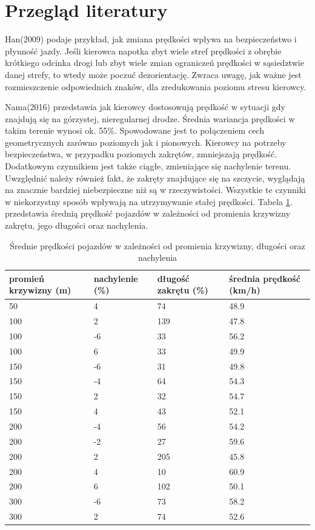 \section{Przegląd literatury}
\label{sec:przegladLiteratury}	

Han(2009) podaje przykład, jak zmiana prędkości wpływa na bezpieczeństwo i płynność jazdy. Jeśli kierowca napotka zbyt wiele stref prędkości z obrębie krótkiego odcinka drogi lub zbyt wiele zmian ograniczeń prędkości w sąsiedztwie danej strefy, to wtedy może poczuć dezorientację. Zwraca uwagę, jak ważne jest rozmieszczenie odpowiednich znaków, dla zredukowania poziomu stresu kierowcy.

Nama(2016) przedstawia jak kierowcy dostosowują prędkość w sytuacji gdy znajdują się na górzystej, nieregularnej drodze. Średnia wariancja prędkości w takim terenie wynosi ok. 55\%. Spowodowane jest to połączeniem cech geometrycznych zarówno poziomych jak i pionowych. Kierowcy na potrzeby bezpieczeństwa, w przypadku poziomych zakrętów, zmniejszają prędkość. Dodatkowym czynnikiem jest także ciągłe, zmieniające się nachylenie terenu. Uwzględnić należy również fakt, że zakręty znajdujące się na szczycie, wyglądają na znacznie bardziej niebezpieczne niż są w rzeczywistości. Wszystkie te czynniki w niekorzystny sposób wpływają na utrzymywanie stałej prędkości. Tabela \ref{predkosciPromienKrzywizny}. przedstawia średnią prędkość pojazdów w zależności od promienia krzywizny zakrętu, jego długości oraz nachylenia.

 
\begin{table}[ht]
\centering
\caption{Średnie prędkości pojazdów w zależności od promienia krzywizny, długości oraz nachylenia}
\label{predkosciPromienKrzywizny}
\begin{tabular}{| l | l | l | l | }
\hline
\textbf{promień krzywizny (m)} & \textbf{nachylenie (\%)} & \textbf{długość zakrętu (\%)} & \textbf{średnia prędkość (km/h)} \\ \hline
50 & 4 & 74 & 48.9\\ \hline
100 & 2 & 139 & 47.8\\ \hline
100 & -6 & 33 & 56.2\\ \hline
100 & 6 & 33 & 49.9\\ \hline
150 & -6 & 31 & 49.8\\ \hline
150 & -4 & 64 & 54.3\\ \hline
150 & 2 & 32 & 54.7\\ \hline
150 & 4 & 43 & 52.1\\ \hline
200 & -4 & 56 & 54.2\\ \hline
200 & -2 & 27 & 59.6\\ \hline
200 & 2 & 205 & 45.8\\ \hline
200 & 4 & 10 & 60.9\\ \hline
200 & 6 & 102 & 50.1\\ \hline
300 & -6 & 73 & 58.2\\ \hline
300 & 2 & 74 & 52.6\\ \hline

\end{tabular}
\end{table}


